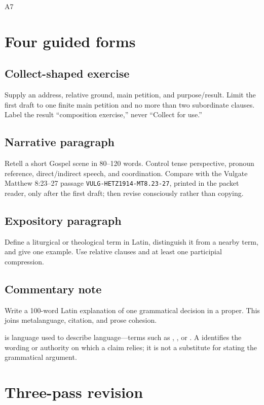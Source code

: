 \begin{courseunit}{A7}
\section{Four guided forms}

\subsection*{Collect-shaped exercise}

Supply an address, relative ground, main petition, and purpose/result. Limit the
first draft to one finite main petition and no more than two subordinate
clauses. Label the result ``composition exercise,'' never ``Collect for use.''

\subsection*{Narrative paragraph}

Retell a short Gospel scene in 80--120 words. Control tense perspective,
pronoun reference, direct/indirect speech, and coordination. Compare with the
Vulgate Matthew 8:23--27 passage \texttt{VULG-HETZ1914-MT8.23-27}, printed in
the packet reader, only after the first draft; then revise consciously rather
than copying.

\subsection*{Expository paragraph}

Define a liturgical or theological term in Latin, distinguish it from a nearby
term, and give one example. Use relative clauses and at least one participial
compression.

\subsection*{Commentary note}

Write a 100-word Latin explanation of one grammatical decision in a proper.
This joins metalanguage, citation, and prose cohesion.

 is language used to describe language---terms such as
, , or . A
 identifies the wording or authority on which a claim relies;
it is not a substitute for stating the grammatical argument.

\section{Three-pass revision}


\end{courseunit}
